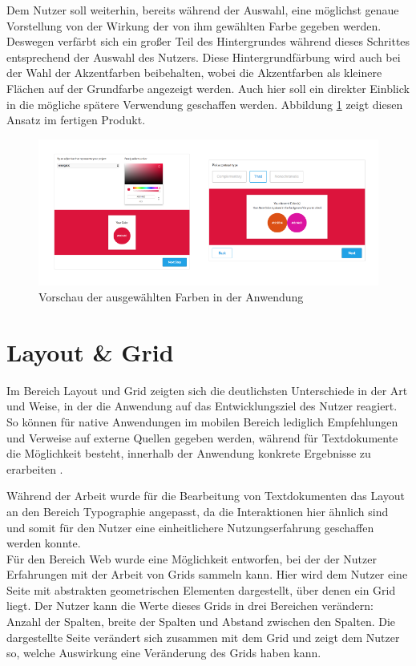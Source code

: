 Dem Nutzer soll weiterhin, bereits während der Auswahl, eine möglichst genaue Vorstellung von der Wirkung der von ihm gewählten Farbe gegeben werden. Deswegen verfärbt sich ein großer Teil des Hintergrundes während dieses Schrittes entsprechend der Auswahl des Nutzers. Diese Hintergrundfärbung wird auch bei der Wahl der Akzentfarben beibehalten, wobei die Akzentfarben als kleinere Flächen auf der Grundfarbe angezeigt werden. Auch hier soll ein direkter Einblick in die mögliche spätere Verwendung geschaffen werden. Abbildung \ref{fig:colors_bg} zeigt diesen Ansatz im fertigen Produkt.

\begin{figure}[h]
    \centering
    \includegraphics[width=1\textwidth]{images/colors_background.png}
    \caption{Vorschau der ausgewählten Farben in der Anwendung}
    \label{fig:colors_bg}
\end{figure}

\section{Layout \& Grid}

Im Bereich Layout und Grid zeigten sich die deutlichsten Unterschiede in der Art und Weise, in der die Anwendung auf das Entwicklungsziel des Nutzer reagiert.
So können für native Anwendungen im mobilen Bereich lediglich Empfehlungen und Verweise auf externe Quellen gegeben werden, während für Textdokumente die Möglichkeit besteht, innerhalb der Anwendung konkrete Ergebnisse zu erarbeiten \cite{PoplawskiPP}.

Während der Arbeit wurde für die Bearbeitung von Textdokumenten das Layout an den Bereich Typographie angepasst, da die Interaktionen hier ähnlich sind und somit für den Nutzer eine einheitlichere Nutzungserfahrung geschaffen werden konnte.\\
Für den Bereich Web wurde eine Möglichkeit entworfen, bei der der Nutzer Erfahrungen mit der Arbeit von Grids sammeln kann. Hier wird dem Nutzer eine Seite mit abstrakten geometrischen Elementen dargestellt, über denen ein Grid liegt. Der Nutzer kann die Werte dieses Grids in drei Bereichen verändern: Anzahl der Spalten, breite der Spalten und Abstand zwischen den Spalten. Die dargestellte Seite verändert sich zusammen mit dem Grid und zeigt dem Nutzer so, welche Auswirkung eine Veränderung des Grids haben kann.

